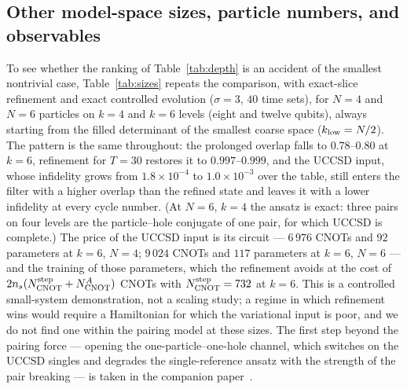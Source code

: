\documentclass[
  aps,            %
  prc,            %
  reprint,        %
  superscriptaddress,
  floatfix,
  nofootinbib
]{revtex4-2}
\begin{document}
\subsection{Other model-space sizes, particle numbers, and observables}
\label{sec:sizes}
To see whether the ranking of Table~\ref{tab:depth} is an accident of the
smallest nontrivial case, Table~\ref{tab:sizes} repeats the comparison, with
exact-slice refinement and exact controlled evolution ($\sigma=3$, $40$ time
sets), for $N=4$ and $N=6$ particles on $k=4$ and $k=6$ levels (eight and
twelve qubits), always starting from the filled determinant of the smallest
coarse space ($k_{\rm low}=N/2$).  The pattern is the same throughout: the
prolonged overlap falls to $0.78$--$0.80$ at $k=6$, refinement for $T=30$
restores it to $0.997$--$0.999$, and the UCCSD input, whose infidelity grows
from $1.8\times10^{-4}$ to $1.0\times10^{-3}$ over the table, still enters the
filter with a higher overlap than the refined state and leaves it with a lower
infidelity at every cycle number.  (At $N=6$, $k=4$ the ansatz is exact: three
pairs on four levels are the particle--hole conjugate of one pair, for which
UCCSD is complete.)  The price of the UCCSD input is its circuit ---
$6\,976$ CNOTs and $92$ parameters at $k=6$, $N=4$; $9\,024$ CNOTs and $117$
parameters at $k=6$, $N=6$ --- and the training of those parameters, which the
refinement avoids at the cost of $2n_s(N_{\rm CNOT}^{\rm step}+N_{\rm CNOT}^{A})$
CNOTs with $N_{\rm CNOT}^{\rm step}=732$ at $k=6$.  This is a controlled
small-system demonstration, not a scaling study; a regime in which refinement
wins would require a Hamiltonian for which the variational input is poor, and
we do not find one within the pairing model at these sizes.  The first step
beyond the pairing force --- opening the one-particle--one-hole channel, which
switches on the UCCSD singles and degrades the single-reference ansatz with
the strength of the pair breaking --- is taken in the companion
paper~\cite{PHcompanion}.
\end{document}
